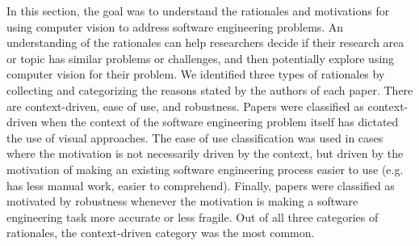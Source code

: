 In this section, 
the goal was to understand the rationales and motivations for using computer vision to
address software engineering problems.
An understanding of the rationales can help researchers
decide if their research area or topic has similar problems or challenges,
and then potentially explore using computer vision for their problem.
We identified three types of rationales by collecting and categorizing the reasons stated by the authors of each paper. There are context-driven, ease of use, and robustness.
Papers were classified as context-driven when the context of the software engineering problem itself
has dictated the use of visual approaches.
The ease of use classification was used in cases where the motivation
is not necessarily driven by the context,
but driven by the motivation of making an existing software engineering process easier to use
(e.g. has less manual work, easier to comprehend).
Finally, papers were classified as motivated by robustness whenever the motivation
is making a software engineering task more accurate or less fragile.
Out of all three categories of rationales, the context-driven category was the most common.





